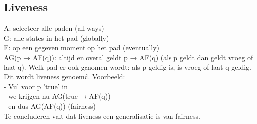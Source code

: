\documentclass{article}
\begin{document}
\subsection{Liveness}
A: selecteer alle paden (all ways)\\
G: alle states in het pad (globally)\\ 
F: op een gegeven moment op het pad (eventually)\\
AG(p → AF(q)): altijd en overal geldt p → AF(q) (als p geldt dan geldt vroeg of laat q). Welk pad er ook genomen wordt: als p geldig is, is vroeg of laat q geldig. Dit wordt liveness genoemd. Voorbeeld:\\
- Vul voor p 'true' in\\
- we krijgen nu AG(true → AF(q))\\
- en dus AG(AF(q)) (fairness)\\
Te concluderen valt dat liveness een generalisatie is van fairness.


\newpage

\newpage


\end{document}
